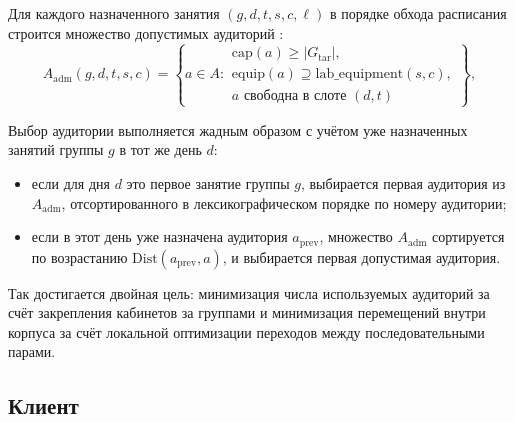 Для каждого назначенного занятия $(g,d,t,s,c,\ell)$ в порядке
обхода расписания строится множество допустимых аудиторий :
\begin{equation}
	A_{\mathrm{adm}}(g,d,t,s,c)
	=
	\left\{
	a \in A :
	\begin{array}{l}
		\mathrm{cap}(a)\ge |G_{\mathrm{tar}}|,\\
		\mathrm{equip}(a)\supseteq \mathrm{lab\_equipment}(s,c),\\
		a \text{ свободна в слоте } (d,t)
	\end{array}
	\right\},
	\label{eq:admissible-classrooms}
\end{equation}

Выбор аудитории выполняется жадным образом с учётом уже
назначенных занятий группы $g$ в тот же день $d$:

\begin{itemize}
	\item если для дня $d$ это первое занятие группы $g$,
	выбирается первая аудитория из $A_{\mathrm{adm}}$, отсортированного
	в лексикографическом порядке по номеру аудитории;

	\item если в этот день уже назначена аудитория $a_{\mathrm{prev}}$,
	множество $A_{\mathrm{adm}}$ сортируется по возрастанию
	$\mathrm{Dist}(a_{\mathrm{prev}}, a)$, и выбирается первая
	допустимая аудитория.
\end{itemize}

Так достигается двойная цель: минимизация числа используемых
аудиторий за счёт закрепления кабинетов за группами и
минимизация перемещений внутри корпуса за счёт локальной
оптимизации переходов между последовательными парами.

\subsection{Клиент}

